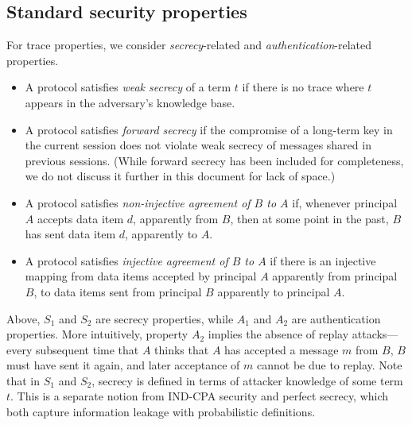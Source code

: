 \documentclass{article}
\theoremstyle{definition}
\begin{document}
\subsection{Standard security properties}
For trace properties, we consider \emph{secrecy}-related and \emph{authentication}-related properties.
\begin{itemize}
    \item[$S_1.$] A protocol satisfies \emph{weak secrecy} \cite{proverif_equations} of a term $t$ 
    if there is no trace where $t$ appears in the adversary's knowledge base.
    \item[$S_2.$]  A protocol satisfies \emph{forward secrecy} \cite{pfs} 
    if the compromise of a long-term key in the current session does not violate weak secrecy of messages 
    shared in previous sessions. (While forward secrecy has been included for completeness, 
    we do not discuss it further in this document for lack of space.)
    \item[$A_1.$] A protocol satisfies \emph{non-injective agreement of $B$ to $A$} \cite{lowe_auth} if, 
    whenever principal $A$ accepts data item $d$, apparently from $B$, then at some point in the past, 
    $B$ has sent data item $d$, apparently to $A$. 
    \item[$A_2.$] A protocol satisfies \emph{injective agreement of $B$ to $A$} \cite{lowe_auth} if 
    there is an injective mapping from data items accepted by principal $A$ apparently from principal $B$, 
    to data items sent from principal $B$ apparently to principal $A$. 
\end{itemize}

Above, $S_1$ and $S_2$ are secrecy properties, while $A_1$ and $A_2$ are authentication properties. 
More intuitively, property $A_2$ implies the absence of replay attacks---every 
subsequent time that $A$ thinks that $A$ has accepted a message $m$ from $B$, $B$ must have sent it again, 
and later acceptance of $m$ cannot be due to replay. 
Note that in $S_1$ and $S_2$, secrecy is defined in terms of attacker knowledge of some term $t$. 
This is a separate notion from IND-CPA security and perfect secrecy, 
which both capture information leakage with probabilistic definitions.
\end{document}
